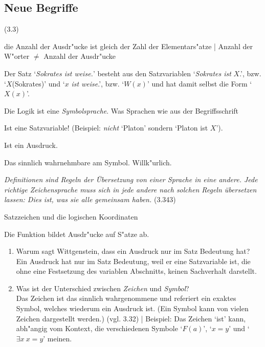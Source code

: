 \documentclass[emulatestandardclasses]{scrartcl}
\begin{document}
\subsection{Neue Begriffe}

\begin{description}[leftmargin=!,labelwidth=\widthof{\bfseries Logische Syntax}]
  \item[Kontextprinzip] (3.3)
  \item[Ausdruck] die Anzahl der Ausdr"ucke ist gleich der Zahl der Elementars"atze | Anzahl der W"orter $\neq$ Anzahl der Ausdr"ucke
  \item[Satzvariable] Der Satz `\emph{Sokrates ist weise.}' besteht aus den Satzvariablen `\emph{Sokrates ist} $X$.', bzw. `$X$(Sokrates)' und `$x$ \emph{ist weise}.', bzw. `$W(x)$' und hat damit selbst die Form `$X(x)$'. 
  \item[Logische Syntax] Die Logik ist eine \emph{Symbolsprache}. Was Sprachen wie aus der Begriffsschrift 
  \item[Name] Ist eine Satzvariable! (Beispiel: \emph{nicht} `Platon' sondern `Platon ist $X$').
  \item[Symbol] Ist ein Ausdruck. 
  \item[Zeichen] Das sinnlich wahrnehmbare am Symbol. Willk"urlich.
  \item[Definition] \emph{Definitionen sind Regeln der Übersetzung von einer Sprache in eine andere. Jede richtige Zeichensprache muss sich in jede andere nach solchen Regeln übersetzen lassen: Dies ist, was sie alle gemeinsam haben.} (3.343)
  \item[Logischer Ort] Satzzeichen und die logischen Koordinaten
\end{description}

Die Funktion bildet Ausdr"ucke auf S"atze ab.

\begin{enumerate}
  \item {\color{NavyBlue}Warum sagt Wittgenstein, dass ein Ausdruck nur im Satz Bedeutung hat?}\\
{\color{ForestGreen} Ein Ausdruck hat nur im Satz Bedeutung, weil er eine Satzvariable ist, die ohne eine Festsetzung des variablen Abschnitts, keinen Sachverhalt darstellt.}
  \item {\color{NavyBlue}Was ist der Unterschied zwischen \emph{Zeichen} und \emph{Symbol}? }\\
{\color{ForestGreen} Das Zeichen ist das sinnlich wahrgenommene und referiert ein exaktes Symbol, welches wiederum ein Ausdruck ist. (Ein Symbol kann von vielen Zeichen dargestellt werden.) (vgl. 3.32)} | Beispiel: Das Zeichen `ist' kann, abh"angig vom Kontext,  die verschiedenen Symbole `$F(a)$', `$x = y$' und `$\exists x~ x = y$' meinen. 
\end{enumerate}
\end{document}
